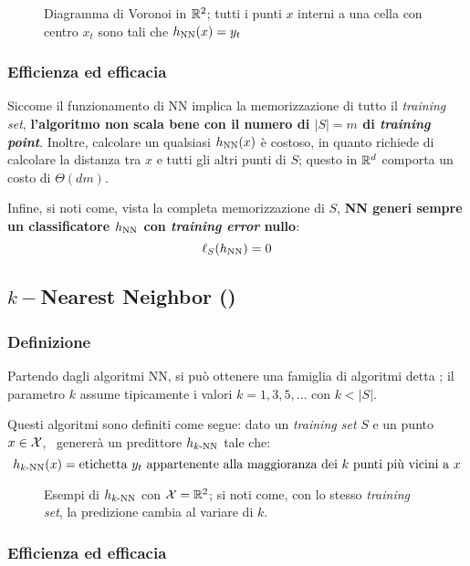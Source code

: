 \begin{figure}[h]
    \centering
    
    \caption{Diagramma di Voronoi in $\mathbb{R}^2$\label{fig:voronoi}; tutti i punti $x$
    interni a una cella con centro \textbullet $x_t$ sono tali che $h_{\text{NN}}(x)=y_t$}
\end{figure}

\subsubsection{Efficienza ed efficacia}

Siccome il funzionamento di NN implica la memorizzazione di tutto il 
\textit{training set}, \textbf{l'algoritmo non scala bene con il numero di
$|S| = m$ di \textit{training point}}. Inoltre, calcolare un qualsiasi
$h_{\text{NN}}(x)$ è costoso, in quanto richiede di calcolare la distanza tra $x$ e
tutti gli altri punti di $S$; questo in $\mathbb{R}^d$ comporta un costo di 
$\Theta (dm)$.

Infine, si noti come, vista la completa memorizzazione di $S$, \textbf{NN generi 
sempre un classificatore $h_{\text{NN}}$ con \textit{training error} nullo}:
$$ \ell_S(h_{\text{NN}})=0 $$

\subsection{\texorpdfstring{$k-$Nearest Neighbor (\kNN)}{k-NN}}

\subsubsection{Definizione}
Partendo dagli algoritmi NN, si può ottenere una famiglia di algoritmi detta
\kNN; il parametro $k$ assume tipicamente i valori $k=1,3,5,\dots$ con $k<|S|$.

Questi algoritmi sono definiti come segue: dato un \textit{training set} $S$ e un
punto $x \in \mathcal{X}$, \kNN \ genererà un predittore $h_{k\text{-NN}}$ tale che:
$$h_{k\text{-NN}}(x) = \text{etichetta $y_t$ appartenente alla maggioranza dei $k$ punti
più vicini a $x$} $$

\begin{figure}[h]
    \centering
    
    \caption{Esempi di $h_{k\text{-NN}}$ con $\mathcal{X}=\mathbb{R}^2$; si noti come, con lo stesso 
    \textit{training set}, la predizione cambia al variare di $k$. \label{fig:knn}}
\end{figure}
\vspace{1em}

\subsubsection{Efficienza ed efficacia}

